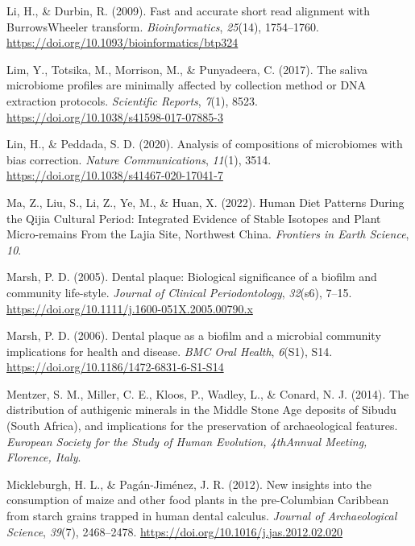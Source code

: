 \documentclass[
  b5paper,
]{book}
\newlength{\cslhangindent}
\newlength{\cslentryspacingunit} %
\newenvironment{CSLReferences}[2] %
 {%
  \setlength{\parindent}{0pt}
  \ifodd #1
  \let\oldpar\par
  \def\par{\hangindent=\cslhangindent\oldpar}
  \fi
  \setlength{\parskip}{#2\cslentryspacingunit}
 }%
 {}
\begin{document}
\begin{CSLReferences}{1}{0}
\leavevmode{}%
Li, H., \& Durbin, R. (2009). Fast and accurate short read alignment
with {Burrows}{\textendash}{Wheeler} transform. \emph{Bioinformatics},
\emph{25}(14), 1754--1760.
\url{https://doi.org/10.1093/bioinformatics/btp324}

\leavevmode{}%
Lim, Y., Totsika, M., Morrison, M., \& Punyadeera, C. (2017). The saliva
microbiome profiles are minimally affected by collection method or {DNA}
extraction protocols. \emph{Scientific Reports}, \emph{7}(1), 8523.
\url{https://doi.org/10.1038/s41598-017-07885-3}

\leavevmode{}%
Lin, H., \& Peddada, S. D. (2020). Analysis of compositions of
microbiomes with bias correction. \emph{Nature Communications},
\emph{11}(1), 3514. \url{https://doi.org/10.1038/s41467-020-17041-7}

\leavevmode{}%
Ma, Z., Liu, S., Li, Z., Ye, M., \& Huan, X. (2022). Human {Diet
Patterns During} the {Qijia Cultural Period}: {Integrated Evidence} of
{Stable Isotopes} and {Plant Micro-remains From} the {Lajia Site},
{Northwest China}. \emph{Frontiers in Earth Science}, \emph{10}.

\leavevmode{}%
Marsh, P. D. (2005). Dental plaque: Biological significance of a biofilm
and community life-style. \emph{Journal of Clinical Periodontology},
\emph{32}(s6), 7--15.
\url{https://doi.org/10.1111/j.1600-051X.2005.00790.x}

\leavevmode{}%
Marsh, P. D. (2006). Dental plaque as a biofilm and a microbial
community {\textendash} implications for health and disease. \emph{BMC
Oral Health}, \emph{6}(S1), S14.
\url{https://doi.org/10.1186/1472-6831-6-S1-S14}

\leavevmode{}%
Mentzer, S. M., Miller, C. E., Kloos, P., Wadley, L., \& Conard, N. J.
(2014). The distribution of authigenic minerals in the {Middle Stone
Age} deposits of {Sibudu} ({South Africa}), and implications for the
preservation of archaeological features. \emph{European Society for the
Study of Human Evolution, {4thAnnual} Meeting, Florence, Italy}.

\leavevmode{}%
Mickleburgh, H. L., \& Pagán-Jiménez, J. R. (2012). New insights into
the consumption of maize and other food plants in the pre-{Columbian
Caribbean} from starch grains trapped in human dental calculus.
\emph{Journal of Archaeological Science}, \emph{39}(7), 2468--2478.
\url{https://doi.org/10.1016/j.jas.2012.02.020}


\end{CSLReferences}
\end{document}
